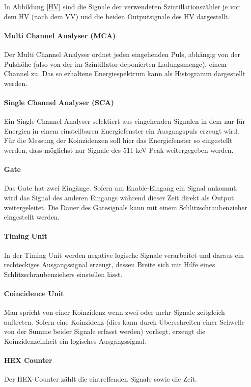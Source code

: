 \documentclass[12pt,listof=totoc]{scrartcl}
\begin{document}
 In Abbildung \ref{HV} sind die Signale der verwendeten Szintillationszähler je vor dem HV (nach dem VV) und die beiden Outputsignale des HV dargestellt.
 \paragraph{Multi Channel Analyser (MCA)}
 Der Multi Channel Analyser ordnet jeden eingehenden Puls, abhängig von der Pulshöhe (also von der im Szintillator deponierten Ladungsmenge), einem Channel zu. Das so erhaltene Energiespektrum kann als Histogramm dargestellt werden.
 \paragraph{Single Channel Analyser (SCA)}
 Ein Single Channel Analyser selektiert aus eingehenden Signalen in dem nur für Energien in einem einstellbaren Energiefenster ein Ausgangspuls erzeugt wird.  Für die Messung der Koinzidenzen soll hier das Energiefenster so eingestellt werden, dass möglichst nur Signale des 511 keV Peak weitergegeben werden.
 \paragraph{Gate} Das Gate hat zwei Eingänge. Sofern am Enable-Eingang ein Signal ankommt, wird das Signal des anderen Eingangs während dieser Zeit direkt als Output weitergeleitet. Die Dauer des Gatesignals kann mit einem Schlitzschraubenzieher eingestellt werden.
 \paragraph{Timing Unit}
 In der Timing Unit werden negative logische Signale verarbeitet und daraus ein rechteckiges Ausgangssignal erzeugt, dessen Breite sich mit Hilfe eines Schlitzschraubenziehers einstellen lässt.
 \paragraph{Coincidence Unit}
 Man spricht von einer Koinzidenz wenn zwei oder mehr Signale zeitgleich auftreten. Sofern eine Koinzidenz (dies kann durch Überschreiten einer Schwelle von der Summe beider Signale erfasst werden) vorliegt, erzeugt die Koinzidenzeinheit ein logisches Ausgangssignal.
 \paragraph{HEX Counter}
Der HEX-Counter zählt die eintreffenden Signale sowie die Zeit.
\end{document}
